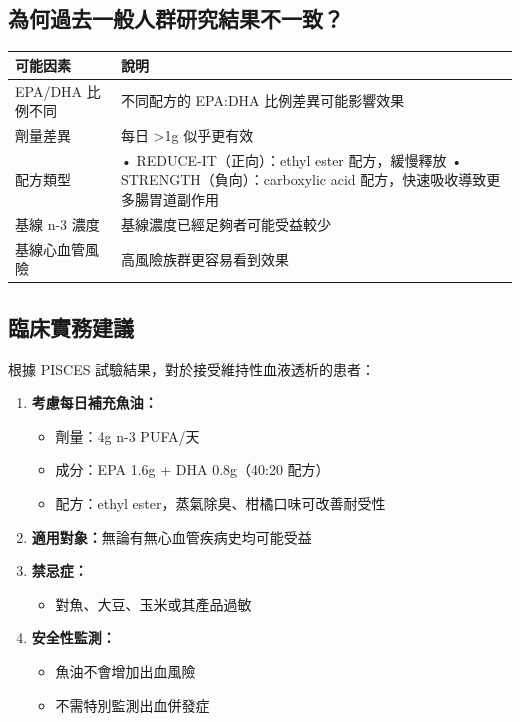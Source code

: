 \documentclass[12pt,a4paper]{article}
\begin{document}
\subsection{為何過去一般人群研究結果不一致？}

\begin{longtable}{p{4cm}p{10cm}}
\toprule
\textbf{可能因素} & \textbf{說明} \\
\midrule
\endfirsthead

\bottomrule
\endfoot

EPA/DHA 比例不同 & 不同配方的 EPA:DHA 比例差異可能影響效果 \\
劑量差異 & 每日 >1g 似乎更有效 \\
配方類型 &
• REDUCE-IT（正向）：ethyl ester 配方，緩慢釋放\newline
• STRENGTH（負向）：carboxylic acid 配方，快速吸收導致更多腸胃道副作用 \\
基線 n-3 濃度 & 基線濃度已經足夠者可能受益較少 \\
基線心血管風險 & 高風險族群更容易看到效果 \\
\bottomrule
\end{longtable}

\subsection{臨床實務建議}

\begin{tcolorbox}[
    colback=emergency_blue!5!white,
    colframe=emergency_blue,
    title=\textbf{臨床建議},
    fonttitle=\bfseries
]
根據 PISCES 試驗結果，對於接受維持性血液透析的患者：

\begin{enumerate}
    \item \textbf{考慮每日補充魚油：}
    \begin{itemize}
        \item 劑量：4g n-3 PUFA/天
        \item 成分：EPA 1.6g + DHA 0.8g（40:20 配方）
        \item 配方：ethyl ester，蒸氣除臭、柑橘口味可改善耐受性
    \end{itemize}

    \item \textbf{適用對象：}無論有無心血管疾病史均可能受益

    \item \textbf{禁忌症：}
    \begin{itemize}
        \item 對魚、大豆、玉米或其產品過敏
    \end{itemize}

    \item \textbf{安全性監測：}
    \begin{itemize}
        \item 魚油不會增加出血風險
        \item 不需特別監測出血併發症
    \end{itemize}
\end{enumerate}
\end{tcolorbox}
\end{document}
